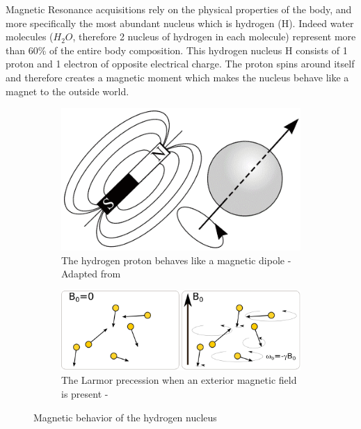 Magnetic Resonance acquisitions rely on the physical properties of the body, and more specifically the most abundant nucleus which is hydrogen (H). Indeed water molecules ($H_2O$, therefore 2 nucleus of hydrogen in each molecule) represent more than 60\% of the entire body composition. This hydrogen nucleus H consists of 1 proton and 1 electron of opposite electrical charge. The proton spins around itself and therefore creates a magnetic moment which makes the nucleus behave like a magnet to the outside world.
\begin{figure}
    \centering
    \begin{subfigure}{.28\textwidth}
        \includegraphics[width=\textwidth]{figures/spin_cm}
        \caption{The hydrogen proton behaves like a magnetic dipole - Adapted from \cite{dipole}}
        \label{fig:hydrogen_magnet}
    \end{subfigure}
    \hfill
    \begin{subfigure}{.68\textwidth}
        \includegraphics[width=\textwidth]{figures/Precession_Larmor_2}
        \caption{The Larmor precession when an exterior magnetic field is present - \cite{hydrogen}}
        \label{fig:larmor_precession}
    \end{subfigure}
    \caption{Magnetic behavior of the hydrogen nucleus}
    \label{fig:hydrogen}
\end{figure}


